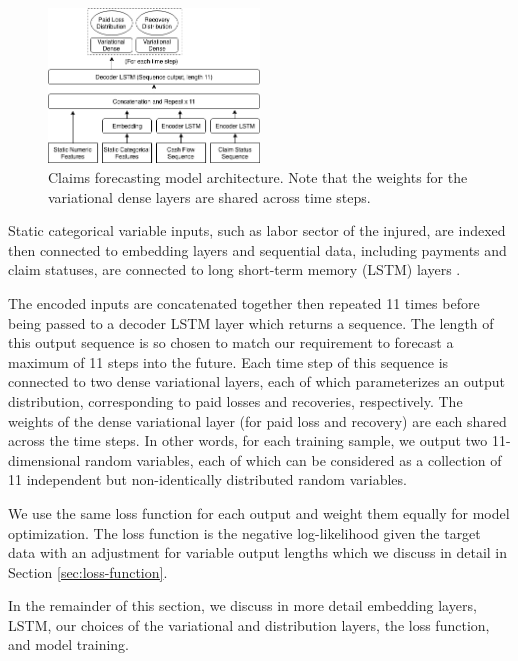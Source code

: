 \documentclass{article}
\begin{document}
\begin{figure}
  \begin{center}
    \includegraphics[width=0.5\textwidth]{images/architecture.png}
  \end{center}
  \caption{Claims forecasting model architecture. Note that the weights for the variational dense layers are shared across time steps.}
  \label{fig:architecture}
\end{figure}

Static categorical variable inputs, such as labor sector of the injured, are indexed then connected to embedding layers \cite{guoEntityEmbeddings2016} and sequential data, including payments and claim statuses, are connected to long short-term memory (LSTM) layers \cite{hochreiterLongShortterm1997}.

The encoded inputs are concatenated together then repeated 11 times before being passed to a decoder LSTM layer which returns a sequence. The length of this output sequence is so chosen to match our requirement to forecast a maximum of 11 steps into the future. Each time step of this sequence is connected to two dense variational layers, each of which parameterizes an output distribution, corresponding to paid losses and recoveries, respectively. The weights of the dense variational layer (for paid loss and recovery) are each shared across the time steps. In other words, for each training sample, we output two 11-dimensional random variables, each of which can be considered as a collection of 11 independent but non-identically distributed random variables.

We use the same loss function for each output and weight them equally for model optimization. The loss function is the negative log-likelihood given the target data with an adjustment for variable output lengths which we discuss in detail in Section \ref{sec:loss-function}.

In the remainder of this section, we discuss in more detail embedding layers, LSTM, our choices of the variational and distribution layers, the loss function, and model training.
\end{document}
